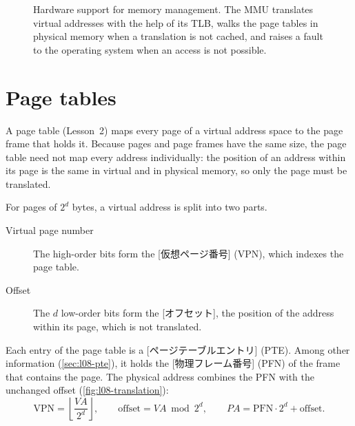 \documentclass[../main.tex]{subfiles}
\begin{document}
\begin{figure}[htbp]
  \centering
  
  \caption{Hardware support for memory management.  The MMU translates
    virtual addresses with the help of its TLB, walks the page tables in
    physical memory when a translation is not cached, and raises a fault to
    the operating system when an access is not possible.}
  \label{fig:l08-mmu}
\end{figure}

\section{Page tables}
\label{sec:l08-page-tables}

A page table (Lesson~2) maps every page of a virtual address space to the
page frame that holds it.  Because pages and page
frames have the same size, the page table need not map every address
individually: the position of an address within its page is the same in
virtual and in physical memory, so only the page must be translated.

For pages of $2^{d}$ bytes, a virtual address is split into two parts.
\begin{description}
  \item[Virtual page number] The high-order bits form the
    [仮想ページ番号]
    (VPN), which indexes the page table.
  \item[Offset] The $d$ low-order bits form the [オフセット],
    the position of the address within its page, which is not translated.
\end{description}
Each entry of the page table is a
[ページテーブルエントリ]
(PTE).  Among other information (\cref{sec:l08-pte}), it holds the
[物理フレーム番号]
(PFN) of the frame that contains the page.  The physical address combines the PFN with the unchanged offset
(\cref{fig:l08-translation}):
\begin{equation}
  \text{VPN} = \left\lfloor \frac{\mathit{VA}}{2^{d}} \right\rfloor ,
  \qquad
  \text{offset} = \mathit{VA} \bmod 2^{d} ,
  \qquad
  \mathit{PA} = \text{PFN} \cdot 2^{d} + \text{offset} .
  \label{eq:l08-translation}
\end{equation}
\end{document}
